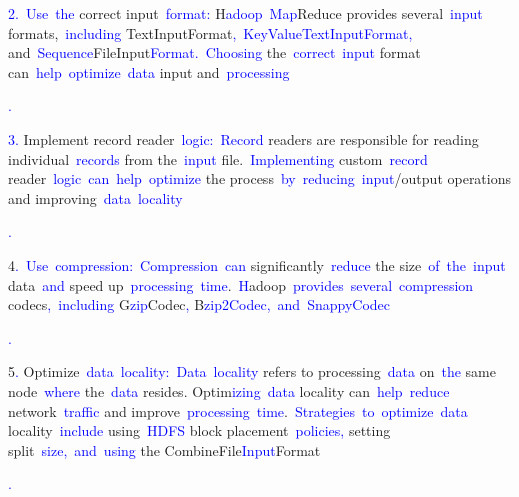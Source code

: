 \documentclass{article}
\begin{document}
\begin{tcolorbox}[colframe=black,colback=white]
{}\textcolor{blue}{2}\textcolor{blue}{.}\textcolor{blue}{~Use}\textcolor{blue}{~the} correct input\textcolor{blue}{~format}\textcolor{blue}{:} H\textcolor{blue}{adoop}\textcolor{blue}{~Map}Reduce provides several\textcolor{blue}{~input} formats,\textcolor{blue}{~including} TextInputFormat\textcolor{blue}{,}\textcolor{blue}{~KeyValue}\textcolor{blue}{TextInput}\textcolor{blue}{Format}\textcolor{blue}{,} and\textcolor{blue}{~Sequence}FileInput\textcolor{blue}{Format}\textcolor{blue}{.}\textcolor{blue}{~Choosing} the\textcolor{blue}{~correct}\textcolor{blue}{~input} format can\textcolor{blue}{~help}\textcolor{blue}{~optimize}\textcolor{blue}{~data} input and\textcolor{blue}{~processing}\textcolor{blue}{.

}\textcolor{blue}{3}\textcolor{blue}{.} Implement record reader\textcolor{blue}{~logic}\textcolor{blue}{:}\textcolor{blue}{~Record} readers are responsible for reading individual\textcolor{blue}{~records} from the\textcolor{blue}{~input} file.\textcolor{blue}{~Implement}\textcolor{blue}{ing} custom\textcolor{blue}{~record} reader\textcolor{blue}{~logic}\textcolor{blue}{~can}\textcolor{blue}{~help}\textcolor{blue}{~optimize} the process\textcolor{blue}{~by}\textcolor{blue}{~reducing}\textcolor{blue}{~input}/output operations and improving\textcolor{blue}{~data}\textcolor{blue}{~locality}\textcolor{blue}{.

}4\textcolor{blue}{.}\textcolor{blue}{~Use}\textcolor{blue}{~compression}\textcolor{blue}{:}\textcolor{blue}{~Compression}\textcolor{blue}{~can} significantly\textcolor{blue}{~reduce} the size\textcolor{blue}{~of}\textcolor{blue}{~the}\textcolor{blue}{~input} data\textcolor{blue}{~and} speed up\textcolor{blue}{~processing}\textcolor{blue}{~time}.\textcolor{blue}{~H}adoop\textcolor{blue}{~provides}\textcolor{blue}{~several}\textcolor{blue}{~compression} codecs\textcolor{blue}{,}\textcolor{blue}{~including} G\textcolor{blue}{zip}Codec\textcolor{blue}{,} B\textcolor{blue}{zip}\textcolor{blue}{2}\textcolor{blue}{Codec}\textcolor{blue}{,}\textcolor{blue}{~and}\textcolor{blue}{~Sn}\textcolor{blue}{appy}\textcolor{blue}{Codec}\textcolor{blue}{.

}5\textcolor{blue}{.} Optimize\textcolor{blue}{~data}\textcolor{blue}{~locality}\textcolor{blue}{:}\textcolor{blue}{~Data}\textcolor{blue}{~locality} refers to processing\textcolor{blue}{~data} on\textcolor{blue}{~the} same node\textcolor{blue}{~where} the\textcolor{blue}{~data} resides. Optim\textcolor{blue}{izing}\textcolor{blue}{~data} locality can\textcolor{blue}{~help}\textcolor{blue}{~reduce} network\textcolor{blue}{~traffic} and improve\textcolor{blue}{~processing}\textcolor{blue}{~time}.\textcolor{blue}{~Strategies}\textcolor{blue}{~to}\textcolor{blue}{~optimize}\textcolor{blue}{~data} locality\textcolor{blue}{~include} using\textcolor{blue}{~H}\textcolor{blue}{DFS} block placement\textcolor{blue}{~policies}\textcolor{blue}{,} setting split\textcolor{blue}{~size}\textcolor{blue}{,}\textcolor{blue}{~and}\textcolor{blue}{~using} the CombineFile\textcolor{blue}{Input}Format\textcolor{blue}{.

}
\end{tcolorbox}
\end{document}
